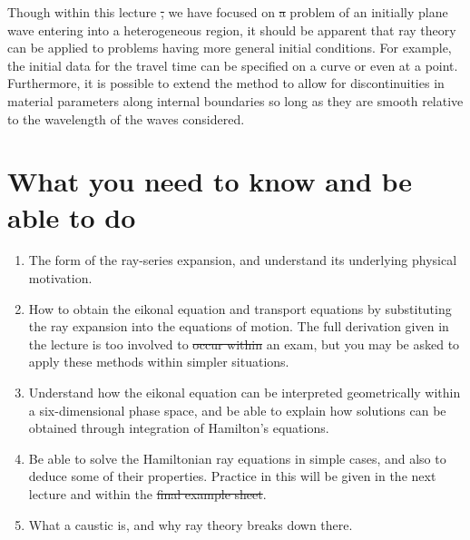 \documentclass [a4paper,12pt]{paper}
\providecommand{\DIFadd}[1]{{\protect\color{blue}\uwave{#1}}} %
\providecommand{\DIFdel}[1]{{\protect\color{red}\sout{#1}}}                      %
\providecommand{\DIFaddbegin}{} %
\providecommand{\DIFaddend}{} %
\providecommand{\DIFdelbegin}{} %
\providecommand{\DIFdelend}{} %
\begin{document}
Though within this lecture \DIFdelbegin \DIFdel{, }\DIFdelend we have focused on \DIFdelbegin \DIFdel{a }\DIFdelend \DIFaddbegin \DIFadd{the }\DIFaddend problem of an initially plane wave entering into a heterogeneous region, it should
 be apparent that ray theory can be applied to problems having more general initial conditions. For example, the initial data for the 
 travel time can be specified on a curve or even at a point. Furthermore, it is possible to extend the method to allow for discontinuities
in material parameters along internal boundaries so long as they are smooth relative to the wavelength of the waves considered.

\section*{What you need to know and be able to do}
\DIFdelbegin %
\DIFdelend \DIFaddbegin \begin{enumerate}
    \DIFaddend \item[(i)] The form of the ray-series expansion, and understand its underlying physical motivation.
    \item[(ii)] How to obtain the eikonal equation and transport equations by substituting the ray expansion into the equations of motion. The full derivation given in the lecture is too involved to \DIFdelbegin \DIFdel{occur within }\DIFdelend \DIFaddbegin \DIFadd{be set in }\DIFaddend an exam, but you may be asked to apply these methods within simpler situations.
    \item[(iii)] Understand how the eikonal equation can be interpreted geometrically within a six-dimensional phase space, and be able to explain how solutions can be obtained through integration of Hamilton's equations.
    \item[(iv)] Be able to solve the Hamiltonian ray equations in simple cases, and also to deduce some of their properties. Practice in this will be given in the next lecture and within the \DIFdelbegin \DIFdel{final example sheet}\DIFdelend \DIFaddbegin \DIFadd{first problem set}\DIFaddend .
    \item[(v)] What a caustic is, and why ray theory breaks down there.
\DIFdelbegin %
\DIFdelend \DIFaddbegin \end{enumerate}

\appendix
\end{document}

